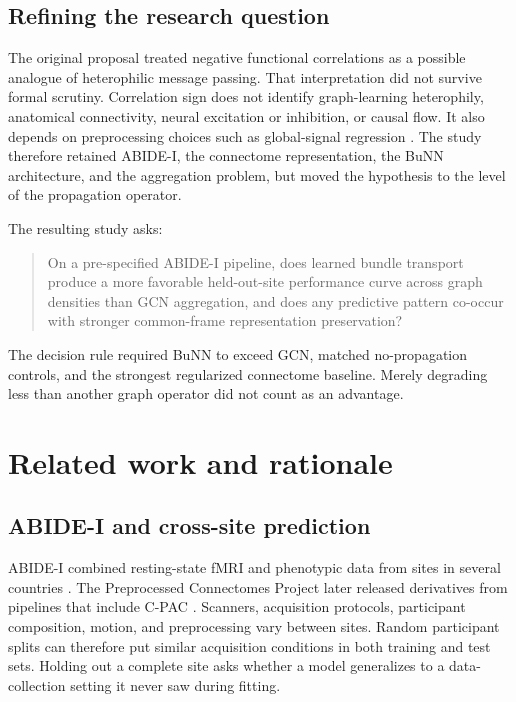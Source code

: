\documentclass[11pt,a4paper]{article}
\begin{document}
\subsection{Refining the research question}

The original proposal treated negative functional correlations as a possible
analogue of heterophilic message passing. That interpretation did not survive
formal scrutiny. Correlation sign does not identify graph-learning
heterophily, anatomical connectivity, neural excitation or inhibition, or
causal flow. It also depends on preprocessing choices such as global-signal
regression \cite{murphy2017global}. The study therefore retained ABIDE-I, the
connectome representation, the BuNN architecture, and the aggregation problem,
but moved the hypothesis to the level of the propagation operator.

The resulting study asks:

\begin{quote}
On a pre-specified ABIDE-I pipeline, does learned bundle transport produce a
more favorable held-out-site performance curve across graph densities than
GCN aggregation, and does any predictive pattern co-occur with stronger
common-frame representation preservation?
\end{quote}

The decision rule required BuNN to exceed GCN, matched no-propagation controls,
and the strongest regularized connectome baseline. Merely degrading less than
another graph operator did not count as an advantage.

\section{Related work and rationale}

\subsection{ABIDE-I and cross-site prediction}

ABIDE-I combined resting-state fMRI and phenotypic data from sites in several
countries \cite{dimartino2014abide}. The Preprocessed Connectomes Project later
released derivatives from pipelines that include C-PAC \cite{abidepcp}.
Scanners, acquisition protocols, participant composition, motion, and
preprocessing vary between sites. Random participant splits can therefore put
similar acquisition conditions in both training and test sets. Holding out a
complete site asks whether a model generalizes to a data-collection setting it
never saw during fitting.
\end{document}
